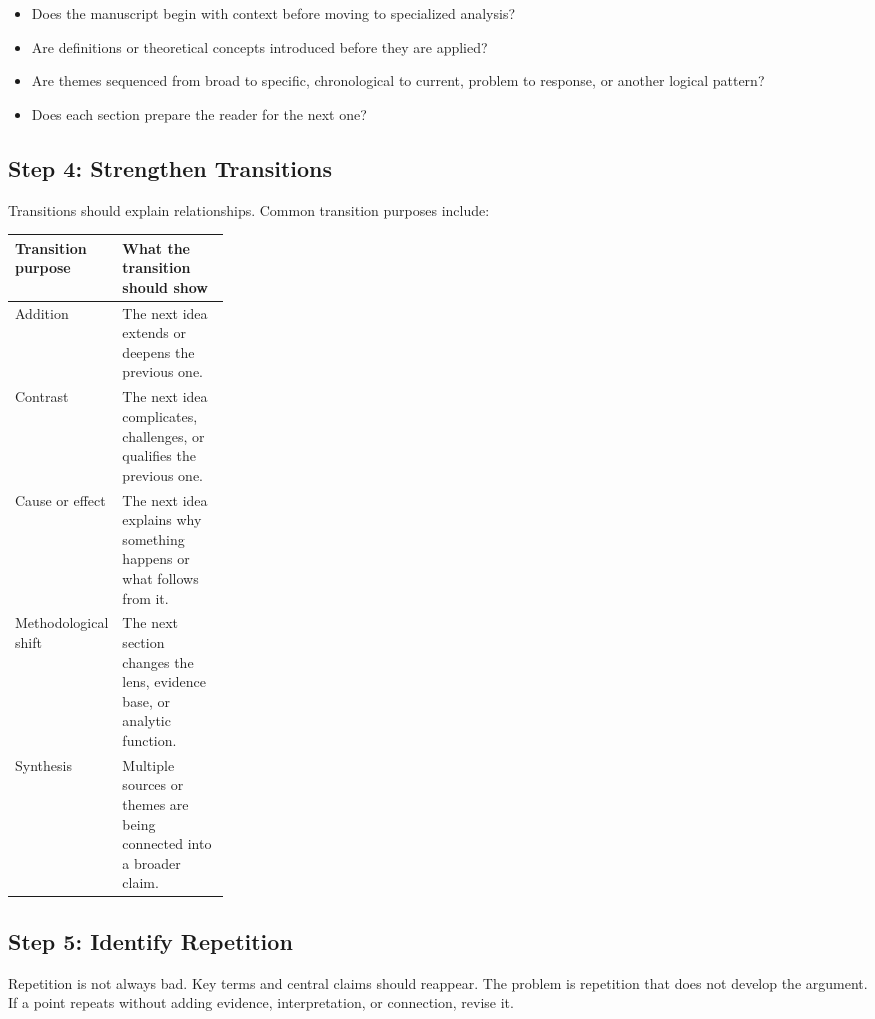 \documentclass[11pt]{article}
\begin{document}
\begin{itemize}
  \item Does the manuscript begin with context before moving to specialized analysis?
  \item Are definitions or theoretical concepts introduced before they are applied?
  \item Are themes sequenced from broad to specific, chronological to current, problem to response, or another logical pattern?
  \item Does each section prepare the reader for the next one?
\end{itemize}

\subsection{Step 4: Strengthen Transitions}

Transitions should explain relationships. Common transition purposes include:

\begin{center}
\begin{tabularx}{0.95\linewidth}{>{\raggedright\arraybackslash}p{0.25\linewidth}Y}
\toprule
\textbf{Transition purpose} & \textbf{What the transition should show} \\
\midrule
Addition & The next idea extends or deepens the previous one. \\
Contrast & The next idea complicates, challenges, or qualifies the previous one. \\
Cause or effect & The next idea explains why something happens or what follows from it. \\
Methodological shift & The next section changes the lens, evidence base, or analytic function. \\
Synthesis & Multiple sources or themes are being connected into a broader claim. \\
\bottomrule
\end{tabularx}
\end{center}

\subsection{Step 5: Identify Repetition}

Repetition is not always bad. Key terms and central claims should reappear. The problem is repetition that does not develop the argument. If a point repeats without adding evidence, interpretation, or connection, revise it.
\end{document}
